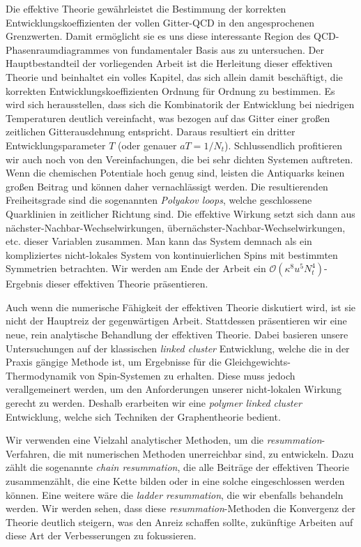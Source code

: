 Die effektive Theorie gewährleistet die Bestimmung der korrekten
Entwicklungskoeffizienten der vollen Gitter-QCD in den angesprochenen
Grenzwerten. Damit ermöglicht sie es uns diese interessante Region des
QCD-Phasenraumdiagrammes von fundamentaler Basis aus zu untersuchen. Der
Hauptbestandteil der vorliegenden Arbeit ist die Herleitung dieser effektiven
Theorie und beinhaltet ein volles Kapitel, das sich allein damit beschäftigt,
die korrekten Entwicklungskoeffizienten Ordnung für Ordnung zu bestimmen. Es
wird sich herausstellen, dass sich die Kombinatorik der Entwicklung bei
niedrigen Temperaturen deutlich vereinfacht, was bezogen auf das Gitter einer
großen zeitlichen Gitterausdehnung entspricht. Daraus resultiert ein dritter
Entwicklungsparameter $T$ (oder genauer  $a T = 1/N_t$). Schlussendlich
profitieren wir auch noch von den Vereinfachungen, die bei sehr dichten Systemen
auftreten. Wenn die chemischen Potentiale hoch genug sind, leisten die
Antiquarks keinen großen Beitrag und können daher vernachlässigt werden. Die
resultierenden Freiheitsgrade sind die sogenannten  \emph{Polyakov  loops},
welche geschlossene Quarklinien in zeitlicher Richtung sind. Die effektive
Wirkung setzt sich dann aus nächster-Nachbar-Wechselwirkungen,
übernächster-Nachbar-Wechselwirkungen, etc. dieser Variablen zusammen. Man kann
das System demnach als ein kompliziertes nicht-lokales System von
kontinuierlichen Spins mit bestimmten Symmetrien betrachten. Wir werden am Ende
der Arbeit ein $\mathcal{O}(\kappa^8 u^5 N_t^4)$-Ergeb\-nis dieser effektiven
Theorie präsentieren.

Auch wenn die numerische Fähigkeit der effektiven Theorie diskutiert wird, ist
sie nicht der Hauptreiz der gegenwärtigen Arbeit. Stattdessen präsentieren wir
eine neue, rein analytische Behandlung der effektiven Theorie. Dabei basieren
unsere Untersuchungen auf der klassischen \emph{linked cluster} Entwicklung,
welche die in der Praxis gängige Methode ist, um Ergebnisse für die
Gleichgewichts-Thermodynamik von Spin-Systemen zu erhalten. Diese muss jedoch
verallgemeinert werden, um den Anforderungen unserer nicht-lokalen Wirkung
gerecht zu werden. Deshalb erarbeiten wir eine \emph{polymer linked cluster}
Entwicklung, welche sich Techniken der Graphentheorie bedient.

Wir verwenden eine Vielzahl analytischer Methoden, um die
\emph{resummation}-Verfahren, die mit numerischen Methoden unerreichbar sind, zu
entwickeln. Dazu zählt die sogenannte \emph{chain resummation}, die alle
Beiträge der effektiven Theorie zusammenzählt, die eine Kette bilden oder in
eine solche eingeschlossen werden können. Eine weitere wäre die \emph{ladder
  resummation}, die wir ebenfalls behandeln werden. Wir werden sehen, dass diese
\emph{resummation}-Methoden die Konvergenz der Theorie deutlich steigern, was
den Anreiz schaffen sollte, zukünftige Arbeiten auf diese Art der Verbesserungen
zu fokussieren.


